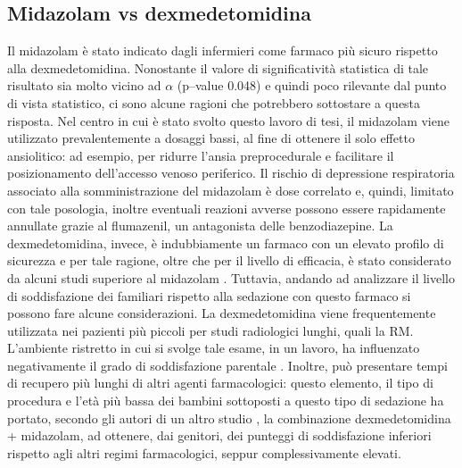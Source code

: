 \subsection*{Midazolam vs dexmedetomidina}
Il midazolam è stato indicato dagli infermieri come farmaco più sicuro rispetto alla dexmedetomidina. Nonostante il valore di significatività statistica di tale risultato sia molto vicino ad $\alpha$ (p--value 0.048) e quindi poco rilevante dal punto di vista statistico, ci sono alcune ragioni che potrebbero sottostare a questa risposta. Nel centro in cui è stato svolto questo lavoro di tesi, il midazolam viene utilizzato prevalentemente a dosaggi bassi, al fine di ottenere il solo effetto ansiolitico: ad esempio, per ridurre l'ansia preprocedurale e facilitare il posizionamento dell'accesso venoso periferico. Il rischio di depressione respiratoria associato alla somministrazione del midazolam è dose correlato e, quindi, limitato con tale posologia, inoltre eventuali reazioni avverse possono essere rapidamente annullate grazie al flumazenil, un antagonista delle benzodiazepine. La dexmedetomidina, invece, è indubbiamente un farmaco con un elevato profilo di sicurezza \citep{Sulton2016} e per tale ragione, oltre che per il livello di efficacia, è stato considerato da alcuni studi superiore al midazolam \citep{Barends2017, Lin}. Tuttavia, andando ad analizzare il livello di soddisfazione dei familiari rispetto alla sedazione con questo farmaco si possono fare alcune considerazioni. La dexmedetomidina viene frequentemente utilizzata nei pazienti più piccoli per studi radiologici lunghi, quali la RM. L'ambiente ristretto in cui si svolge tale esame, in un lavoro, ha influenzato negativamente il grado di soddisfazione parentale \citep{Lew2010}. Inoltre, può presentare tempi di recupero più lunghi di altri agenti farmacologici: questo elemento, il tipo di procedura e l'età più bassa dei bambini sottoposti a questo tipo di sedazione ha portato, secondo gli autori di un altro studio \citep{Cortellazzo2022}, la combinazione dexmedetomidina + midazolam, ad ottenere, dai genitori, dei punteggi di soddisfazione inferiori rispetto agli altri regimi farmacologici, seppur complessivamente elevati.



